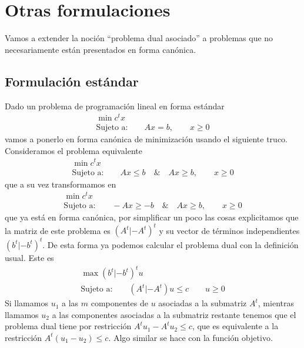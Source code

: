\section{Otras formulaciones}
Vamos a extender la noción ``problema dual asociado'' a problemas que no necesariamente están presentados en forma canónica.
\subsection{Formulación estándar}
Dado un problema de programación lineal en forma estándar
\begin{equation*}
\begin{array}{c}
\min c^tx\\
\text{Sujeto a:}\qquad Ax= b,\qquad x\geq 0
\end{array}
\end{equation*}
vamos a ponerlo en forma canónica de minimización usando el siguiente truco. Consideramos el problema equivalente
\begin{equation*}
\begin{array}{c}
\min c^tx\\
\text{Sujeto a:}\qquad Ax\leq b\quad \&\quad Ax\geq b,\qquad x\geq 0
\end{array}
\end{equation*}
que a su vez transformamos en
\begin{equation*}
\begin{array}{c}
\min c^tx\\
\text{Sujeto a:}\qquad -Ax\geq -b\quad \&\quad Ax\geq b,\qquad x\geq 0
\end{array}
\end{equation*}
que ya está en forma canónica, por simplificar un poco las cosas explicitamos que la matriz de este problema es $(A^t|-A^t)^t$ y su vector de términos independientes $(b^t|-b^t)^t$. De esta forma ya podemos calcular el problema dual con la definición usual. Este es
\begin{equation*}
\begin{array}{c}
\max (b^t|-b^t)^tu\\
\text{Sujeto a:}\qquad(A^t|-A^t)u\leq c\qquad u\geq 0
\end{array}
\end{equation*}
Si llamamos $u_1$ a las $m$ componentes de $u$ asociadas a la submatriz $A^t$, mientras llamamos $u_2$ a las componentes asociadas a la submatriz restante tenemos que el problema dual tiene por restricción $A^tu_1-A^tu_2\leq c$, que es equivalente a la restricción $A^t(u_1-u_2)\leq c$. Algo similar se hace con la función objetivo.

